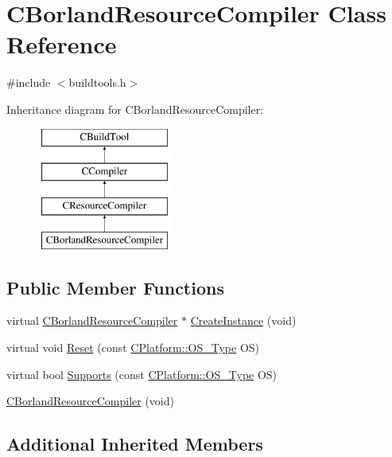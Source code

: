 \hypertarget{classCBorlandResourceCompiler}{\section{C\-Borland\-Resource\-Compiler Class Reference}
\label{classCBorlandResourceCompiler}
}


{\ttfamily \#include $<$buildtools.\-h$>$}

Inheritance diagram for C\-Borland\-Resource\-Compiler\-:\begin{figure}[H]
\begin{center}
\leavevmode
\includegraphics[height=4.000000cm]{d8/d19/classCBorlandResourceCompiler}
\end{center}
\end{figure}
\subsection*{Public Member Functions}
\begin{DoxyCompactItemize}
\item 
virtual \hyperlink{classCBorlandResourceCompiler}{C\-Borland\-Resource\-Compiler} $\ast$ \hyperlink{classCBorlandResourceCompiler_a5c6aeef4fa07fb9693feb860a70729e0}{Create\-Instance} (void)
\item 
virtual void \hyperlink{classCBorlandResourceCompiler_a586f49a9ccb4b38f3a74534eb3876c55}{Reset} (const \hyperlink{classCPlatform_a2fb735c63c53052f79629e338bb0f535}{C\-Platform\-::\-O\-S\-\_\-\-Type} O\-S)
\item 
virtual bool \hyperlink{classCBorlandResourceCompiler_a114094b4bedcad07c1986e8023ed2aca}{Supports} (const \hyperlink{classCPlatform_a2fb735c63c53052f79629e338bb0f535}{C\-Platform\-::\-O\-S\-\_\-\-Type} O\-S)
\item 
\hyperlink{classCBorlandResourceCompiler_a1407b894694903745b9e7d464ac85cbb}{C\-Borland\-Resource\-Compiler} (void)
\end{DoxyCompactItemize}
\subsection*{Additional Inherited Members}


